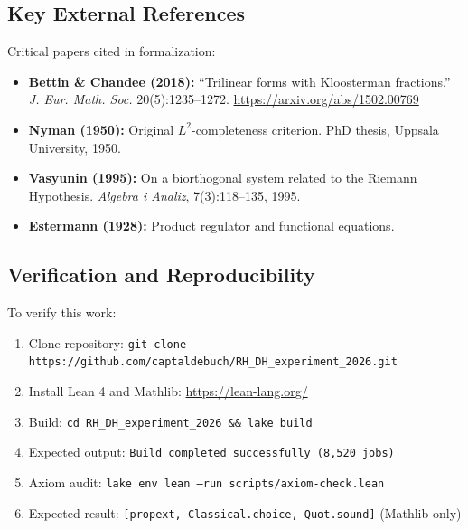 \documentclass[11pt,a4paper]{article}
\theoremstyle{plain}
\theoremstyle{definition}
\theoremstyle{remark}
\begin{document}
\subsection{Key External References}

Critical papers cited in formalization:

\begin{itemize}[leftmargin=2em]
  \item \textbf{Bettin \& Chandee (2018):} ``Trilinear forms with Kloosterman fractions.'' \emph{J. Eur. Math. Soc.} 20(5):1235--1272. \url{https://arxiv.org/abs/1502.00769}
  \item \textbf{Nyman (1950):} Original $L^2$-completeness criterion. PhD thesis, Uppsala University, 1950.
  \item \textbf{Vasyunin (1995):} On a biorthogonal system related to the Riemann Hypothesis. \emph{Algebra i Analiz}, 7(3):118--135, 1995.
  \item \textbf{Estermann (1928):} Product regulator and functional equations. \cite{Estermann1928}
\end{itemize}

\subsection{Verification and Reproducibility}

To verify this work:

\begin{enumerate}[label=\textbf{\arabic*.}]
  \item Clone repository: \texttt{git clone https://github.com/captaldebuch/RH_DH_experiment_2026.git}
  \item Install Lean 4 and Mathlib: \url{https://lean-lang.org/}
  \item Build: \texttt{cd RH_DH_experiment_2026 \&\& lake build}
  \item Expected output: \texttt{Build completed successfully (8,520 jobs)}
  \item Axiom audit: \texttt{lake env lean --run scripts/axiom-check.lean}
  \item Expected result: \texttt{[propext, Classical.choice, Quot.sound]} (Mathlib only)
\end{enumerate}
\end{document}
